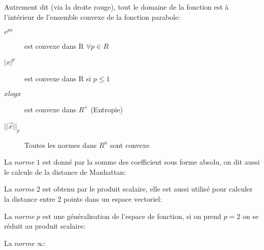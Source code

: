 Autrement dit (via la droite rouge), tout le domaine de la fonction est à l'intérieur de l'ensemble convexe de la fonction parabole:
\begin{multicols}{2}
[]



\begin{description}
\item[$e^{px}$] est convexe dans R $\forall p \in R$
\item[$|x|^p$]  est convexe dans R si $p \leq 1$
\item[$x log x$]est convexe dans $R^+$ (Entropie)
\item[$||\vec{x}||_p$] Toutes les normes dans $R^n$ sont convexe 
\end{description}
\end{multicols}

La $norme\ 1$ est donné par la somme des coefficient sous forme absolu, on dit aussi le calcule de la distance de Manhattan:

La $norme\ 2$ est obtenu par le produit scalaire, elle est aussi utilisé pour calculer la distance entre 2 points dans un espace vectoriel:

La $norme\ p$ est une généralisation de l'espace de fonction, si on prend $p=2$ on se réduit au produit scalaire:

La $norme\ \infty$:

